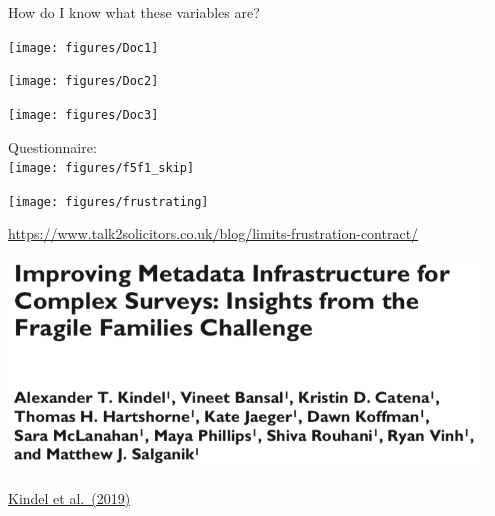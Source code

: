 \documentclass[aspectratio=169]{beamer}
\begin{document}
%
\begin{frame}

How do I know what these variables are? 

\end{frame}
\begin{frame}

\centering\texttt{[image: figures/Doc1]}

\end{frame}
\begin{frame}

\centering\texttt{[image: figures/Doc2]}

\end{frame}
\begin{frame}

\centering\texttt{[image: figures/Doc3]}

\end{frame}
\begin{frame}

Questionnaire:\\
\centering\texttt{[image: figures/f5f1\_skip]}

\end{frame}
\begin{frame}

\begin{center}
\texttt{[image: figures/frustrating]}
\end{center}

\vfill
\tiny{\url{https://www.talk2solicitors.co.uk/blog/limits-frustration-contract/}}

\end{frame}
\begin{frame}

\begin{center}
\includegraphics[width=0.95\textwidth]{figures/kindel_improving_2019_title}
\end{center}

\vfill
\href{https://doi.org/10.1177/2378023118817378}{Kindel et al.\ (2019)}
\end{frame}
\end{document}
